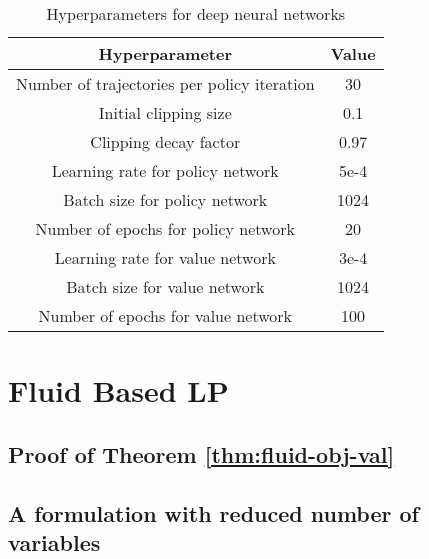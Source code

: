 \begin{table}[h]
    \centering
    \begin{tabular}{|c|c|}
        \hline
        Hyperparameter & Value \\
        \hline
        Number of trajectories per policy iteration & 30 \\%
        Initial clipping size & 0.1 \\
        Clipping decay factor & 0.97\\
        \hline
        Learning rate for policy network & 5e-4\\
        Batch size for policy network & 1024 \\
        Number of epochs for policy network & 20 \\
        \hline
        Learning rate for value network & 3e-4 \\
        Batch size for value network & 1024 \\
        Number of epochs for value network & 100 \\
        \hline
    \end{tabular}
    \caption{Hyperparameters for deep neural networks}
    \label{tab:nn-params}
\end{table}

\section{Fluid Based LP}
\subsection{Proof of Theorem \ref{thm:fluid-obj-val}}


\subsection{A formulation with reduced number of variables}
